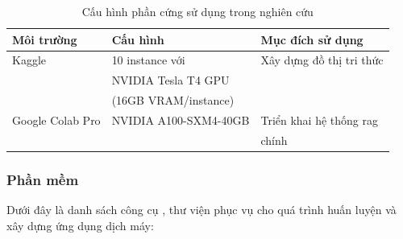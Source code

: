 \begin{table}[ht]
    \centering
    \caption{Cấu hình phần cứng sử dụng trong nghiên cứu}
    \begin{tabular}{|l|l|l|}
        \hline
        \textbf{Môi trường} & \textbf{Cấu hình}     & \textbf{Mục đích sử dụng}     \\ \hline
        Kaggle              & 10 instance với       & Xây dựng đồ thị tri thức      \\
                            & NVIDIA Tesla T4 GPU   &                               \\
                            & (16GB VRAM/instance)  &                               \\ \hline
        Google Colab Pro    & NVIDIA A100-SXM4-40GB & Triển khai hệ thống \gls{rag} \\
                            &                       & chính                         \\ \hline
    \end{tabular}
    \label{tab:hardware}
\end{table}
\subsubsection{Phần mềm}
Dưới đây là danh sách công cụ , thư viện phục vụ cho quá trình huấn luyện và xây dựng ứng dụng dịch máy:


